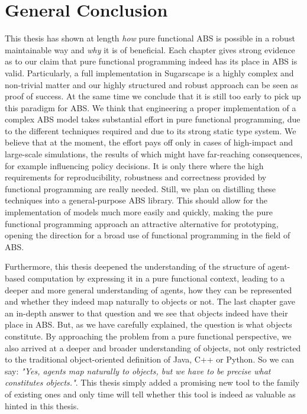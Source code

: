 \chapter{General Conclusion}
\label{ch:conclusion}

This thesis has shown at length \textit{how} pure functional ABS is possible in a robust maintainable way and \textit{why} it is of beneficial. Each chapter gives strong evidence as to our claim that pure functional programming indeed has its place in ABS is valid. Particularly, a full implementation in Sugarscape is a highly complex and non-trivial matter and our highly structured and robust approach can be seen as proof of success. At the same time we conclude that it is still too early to pick up this paradigm for ABS. We think that engineering a proper implementation of a complex ABS model takes substantial effort in pure functional programming, due to the different techniques required and due to its strong static type system. We believe that at the moment, the effort pays off only in cases of high-impact and large-scale simulations, the results of which might have far-reaching consequences, for example influencing policy decisions. It is only there where the high requirements for reproducibility, robustness and correctness provided by functional programming are really needed. Still, we plan on distilling these techniques into a general-purpose ABS library. This should allow for the implementation of models much more easily and quickly, making the pure functional programming approach an attractive alternative for prototyping, opening the direction for a broad use of functional programming in the field of ABS.

Furthermore, this thesis deepened the understanding of the structure of agent-based computation by expressing it in a pure functional context, leading to a deeper and more general understanding of agents, how they can be represented and whether they indeed map naturally to objects or not. The last chapter gave an in-depth answer to that question and we see that objects indeed have their place in ABS. But, as we have carefully explained, the question is what objects constitute. By approaching the problem from a pure functional perspective, we also arrived at a deeper and broader understanding of objects, not only restricted to the traditional object-oriented definition of Java, C++ or Python. So we can say: \textit{"Yes, agents map naturally to objects, but we have to be precise what constitutes objects."}. This thesis simply added a promising new tool to the family of existing ones and only time will tell whether this tool is indeed as valuable as hinted in this thesis.

